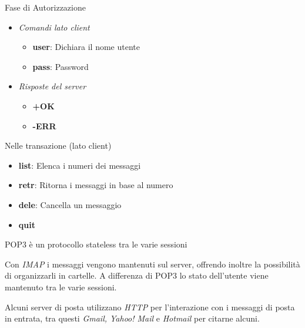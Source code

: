 \documentclass{article}
\newcounter{subsubsubsection}[subsubsection]
\begin{document}
                    Fase di Autorizzazione
                    \begin{itemize}
                        \item \textit{Comandi lato client}
                              \begin{itemize}
                                  \item \textbf{user}: Dichiara il nome utente
                                  \item \textbf{pass}: Password 
                              \end{itemize}
                        \item \textit{Risposte del server}
                              \begin{itemize}
                                  \item \textbf{+OK}
                                  \item \textbf{-ERR}
                              \end{itemize}
                    \end{itemize}
                    Nelle transazione (lato client)
                    \begin{itemize}
                        \item \textbf{list}: Elenca i numeri dei messaggi
                        \item \textbf{retr}: Ritorna i messaggi in base al numero
                        \item \textbf{dele}: Cancella un messaggio
                        \item \textbf{quit}
                    \end{itemize}
                    POP3 è un protocollo stateless tra le varie sessioni

                    Con \textit{IMAP} i messaggi vengono mantenuti sul server, offrendo inoltre la possibilità di organizzarli in cartelle. A differenza di POP3 lo stato dell'utente viene mantenuto tra le varie sessioni. 

                    Alcuni server di posta utilizzano \textit{HTTP} per l'interazione con i messaggi di posta in entrata, tra questi \textit{Gmail, Yahoo! Mail} e \textit{Hotmail} per citarne alcuni.
\end{document}
